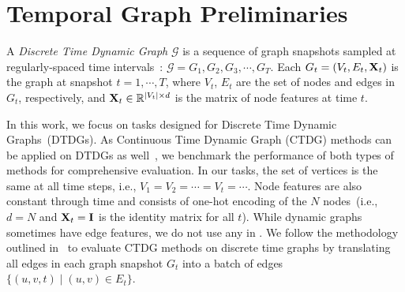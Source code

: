 \section{Temporal Graph Preliminaries}

\begin{definition} 
A \emph{Discrete Time Dynamic Graph} $\mathcal{G}$ is a sequence of graph snapshots sampled at regularly-spaced time intervals~\cite{kazemi2020representation}:
$ \mathcal G = G_1,G_2,G_3,\cdots,G_T.$
Each $G_t = (V_t, E_t, \mathbf{X}_t)$ is the graph at snapshot $t=1,\cdots, T$, where ${V}_t$, ${E}_t$ are the set of nodes and edges in ${G}_t$, respectively, and $\mathbf{X}_t\in \mathbb R^{|V_t| \times d}$ is the matrix of node features at time $t$.
\end{definition}

In this work, we focus on tasks designed for Discrete Time Dynamic Graphs~(DTDGs). As Continuous Time Dynamic Graph (CTDG) methods can be applied on DTDGs as well~\cite{huangutg}, we benchmark the performance of both types of methods for comprehensive evaluation.
In our tasks, the set of vertices is the same at all time steps, i.e., $V_1=V_2=\cdots =V_t = \cdots$. Node features are also constant through time and consists of one-hot encoding of the $N$ nodes~(i.e., $d=N$ and $\mathbf{X}_t = \mathbf{I}$ is the identity matrix for all $t$). While dynamic graphs sometimes have edge features, we do not use any in \benchmarkname. We follow the methodology outlined in~\cite{huangutg} to evaluate CTDG methods on discrete time graphs by translating all edges in each graph snapshot $G_t$ into a batch of edges $\{(u,v,t) \mid (u,v)\in E_t\}$. 

